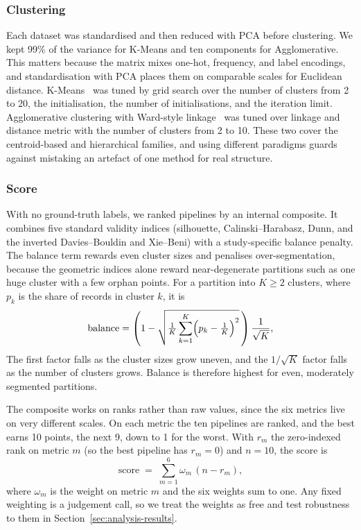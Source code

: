 \documentclass[conference]{IEEEtran}
\begin{document}
\subsubsection{Clustering}
Each dataset was standardised and then reduced with PCA before clustering. We kept 99\% of the variance for K-Means and ten components for Agglomerative. This matters because the matrix mixes one-hot, frequency, and label encodings, and standardisation with PCA places them on comparable scales for Euclidean distance. K-Means~\cite{macqueen1967kmeans} was tuned by grid search over the number of clusters from 2 to 20, the initialisation, the number of initialisations, and the iteration limit. Agglomerative clustering with Ward-style linkage~\cite{ward1963hierarchical} was tuned over linkage and distance metric with the number of clusters from 2 to 10. These two cover the centroid-based and hierarchical families, and using different paradigms guards against mistaking an artefact of one method for real structure.

\subsubsection{Score}
With no ground-truth labels, we ranked pipelines by an internal composite. It combines five standard validity indices (silhouette, Calinski--Harabasz, Dunn, and the inverted Davies--Bouldin and Xie--Beni) with a study-specific balance penalty. The balance term rewards even cluster sizes and penalises over-segmentation, because the geometric indices alone reward near-degenerate partitions such as one huge cluster with a few orphan points. For a partition into $K\geq2$ clusters, where $p_k$ is the share of records in cluster $k$, it is
\begin{equation}\label{eq:balance}
\text{balance} = \left(1 - \sqrt{\tfrac{1}{K}\sum_{k=1}^{K}\Bigl(p_k - \tfrac{1}{K}\Bigr)^{2}}\,\right)\frac{1}{\sqrt{K}},
\end{equation}
The first factor falls as the cluster sizes grow uneven, and the $1/\sqrt{K}$ factor falls as the number of clusters grows. Balance is therefore highest for even, moderately segmented partitions.

The composite works on ranks rather than raw values, since the six metrics live on very different scales. On each metric the ten pipelines are ranked, and the best earns 10 points, the next 9, down to 1 for the worst. With $r_m$ the zero-indexed rank on metric $m$ (so the best pipeline has $r_m=0$) and $n=10$, the score is
\begin{equation}\label{eq:composite}
\text{score} \;=\; \sum_{m=1}^{6} \omega_m \,(n - r_m),
\end{equation}
where $\omega_m$ is the weight on metric $m$ and the six weights sum to one. Any fixed weighting is a judgement call, so we treat the weights as free and test robustness to them in Section~\ref{sec:analysis-results}.
\end{document}
